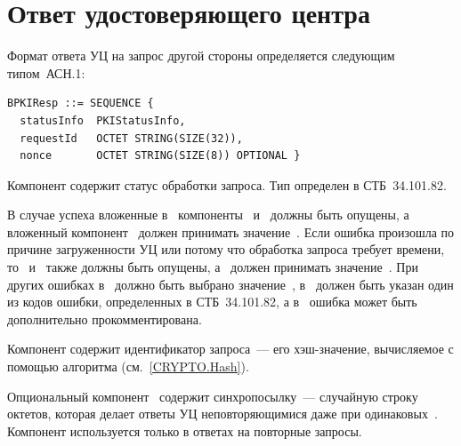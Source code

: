 \section{Ответ удостоверяющего центра}\label{FMT.BPKIResp}

Формат ответа УЦ на запрос другой стороны определяется следующим типом~АСН.1:
\begin{verbatim}
BPKIResp ::= SEQUENCE { 
  statusInfo  PKIStatusInfo,
  requestId   OCTET STRING(SIZE(32)),
  nonce       OCTET STRING(SIZE(8)) OPTIONAL }
\end{verbatim}

Компонент  содержит статус обработки запроса. Тип
 определен в СТБ~34.101.82.

В случае успеха вложенные в~ компоненты~
и~ должны быть опущены, а вложенный компонент~
должен принимать значение~.
%
Если ошибка произошла по причине загруженности УЦ или потому что обработка
запроса требует времени, то~ и~ также должны
быть опущены, а~ должен принимать значение~.
%
При других ошибках в~ должно быть выбрано
значение~, в~ должен быть указан один из кодов
ошибки, определенных в СТБ~34.101.82, а в~ ошибка может быть
дополнительно прокомментирована.

Компонент  содержит идентификатор запроса~--- его хэш-значение,
вычисляемое с помощью алгоритма  (см.~\ref{CRYPTO.Hash}).

Опциональный компонент~ содержит синхропосылку~--- случайную строку
октетов, которая делает ответы УЦ неповторяющимися даже при
одинаковых~. Компонент используется только в ответах на
повторные запросы.
